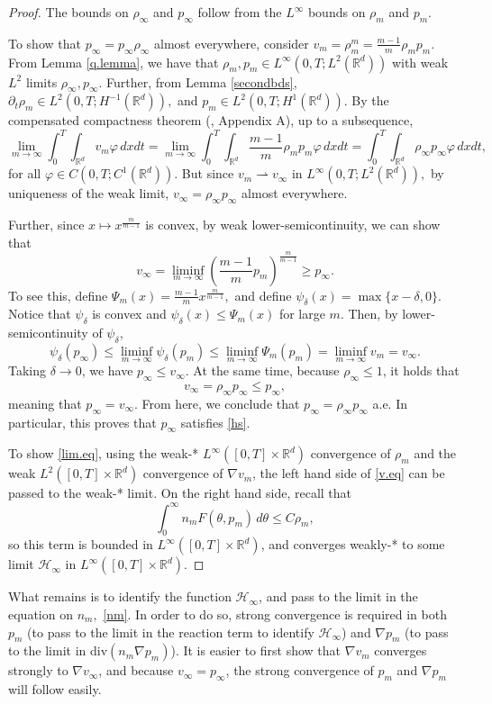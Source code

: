 \documentclass{amsart}
\def\R{\mathbb R}
\begin{document}
\begin{proof}
    The bounds on $\rho_\infty$ and $p_\infty$ follow from the $L^\infty$ bounds on $\rho_m$ and $p_m$. 
    
    To show that $p_{\infty}=p_{\infty}\rho_{\infty}$ almost everywhere, consider $v_m=\rho_m^m=\frac{m-1}{m}\rho_mp_m.$ From Lemma \ref{q.lemma}, we have that $\rho_m, p_m \in L^\infty(0,T;L^2(\R^d))$ with weak $L^2$ limits $\rho_\infty, p_\infty$. Further,  from Lemma \ref{secondbds}, $\partial_t \rho_m \in L^2(0,T;H^{-1}(\R^d)),$ and $p_m \in L^2(0,T;H^1(\R^d)).$ By the compensated compactness theorem (\cite{david}, Appendix A), up to a subsequence,
    \begin{equation*}
       \lim_{m\rightarrow \infty} \int_{0}^{T} \int_{\R^d} v_m \varphi \, dx dt=\lim_{m\rightarrow \infty}\int_{0}^{T}\int_{\R^d}\frac{m-1}{m}\rho_m p_m \varphi\,dx dt = \int_0^T \int_{\R^d} \rho_\infty p_\infty \varphi \, dx dt,
    \end{equation*}
    for all $\varphi \in C(0,T;C^1(\R^d)).$ But since $v_m \rightharpoonup v_\infty$ in $L^\infty(0,T;L^2(\R^d)),$ by uniqueness of the weak limit, $v_\infty =\rho_\infty p_\infty$ almost everywhere.

    Further, since $x \mapsto x^{\frac{m}{m-1}}$ is convex, by weak lower-semicontinuity, we can show that
    $$
    v_\infty  =\liminf_{m \rightarrow \infty}(\frac{m-1}{m}p_m)^{\frac{m}{m-1}}\geq p_\infty.$$
    To see this, define $\Psi_m(x)=\frac{m-1}{m}x^{\frac{m}{m-1}},$ and define $\psi_\delta(x)=\max \{x-\delta,0\}$. Notice that $\psi_\delta$ is convex and $\psi_\delta(x)\leq\Psi_m(x)$ for large $m$. Then, by lower-semicontinuity of $\psi_\delta$,
    $$
    \psi_\delta(p_\infty)\leq \liminf_{m\rightarrow\infty}\psi_\delta(p_m)\leq \liminf_{m \rightarrow\infty}\Psi_m(p_m)=\liminf_{m\rightarrow\infty}v_m=v_\infty.
    $$
    Taking $\delta \rightarrow 0$, we have $
    p_\infty \leq v_\infty.$
    At the same time, because $\rho_\infty \leq 1$, it holds that
    $$
    v_\infty =\rho_\infty p_\infty \leq p_\infty,$$
meaning that $p_\infty=v_\infty.$
  From here, we conclude that $p_\infty=\rho_\infty p_\infty$ a.e. In particular, this proves that $p_\infty$ satisfies \eqref{hs}.

    To show \eqref{lim.eq}, using the weak-* $L^\infty([0,T]\times\R^d)$ convergence of $\rho_m$ and the weak $L^2([0,T]\times\R^d)$ convergence of $\nabla v_m$, the left hand side of \eqref{v.eq} can be passed to the weak-* limit. On the right hand side, recall that $$\int_{0}^{\infty}n_mF(\theta,p_m)\, d\theta\leq C\rho_m,$$ so this term is bounded in $L^\infty([0,T]\times \R^d)$, and converges weakly-* to some limit $\mathcal{H}_\infty$ in $L^\infty([0,T]\times\R^d).$
\end{proof}
What remains is to identify the function $\mathcal{H}_\infty$, and pass to the limit in the equation on $n_m,$ \eqref{nm}. In  order to do so, strong convergence is required in both $p_m$ (to pass to the limit in the reaction term to identify $\mathcal{H}_\infty$) and $\nabla p_m$ (to pass to the limit in div$(n_m \nabla p_m)$). It is easier to first show that $\nabla v_m$ converges strongly to $\nabla v_\infty$, and because $v_\infty=p_\infty$, the strong convergence of $p_m$ and $\nabla p_m$ will follow easily.
\end{document}
